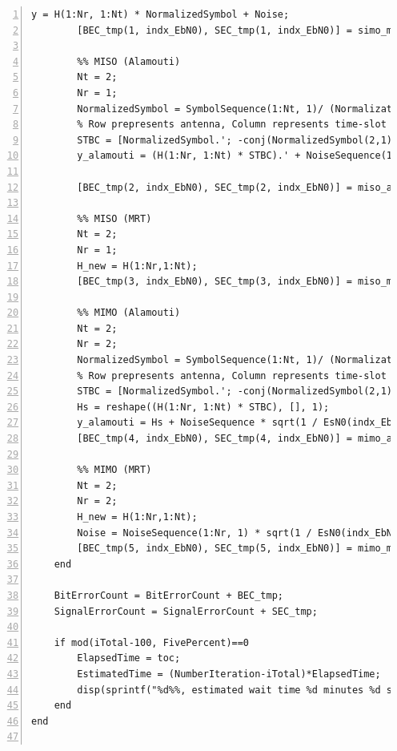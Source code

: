 \documentclass{article}
\begin{document}
\begin{lstlisting}[style=Matlab-editor, frame=single, numbers=left,]
        y = H(1:Nr, 1:Nt) * NormalizedSymbol + Noise;
        [BEC_tmp(1, indx_EbN0), SEC_tmp(1, indx_EbN0)] = simo_mrc(y, SignalSequence(1:Nt,1), SignalBinary(1:Nt, :),  M, H(1:Nr, 1:Nt));
        
        %% MISO (Alamouti)
        Nt = 2;
        Nr = 1;
        NormalizedSymbol = SymbolSequence(1:Nt, 1)/ (NormalizationFactor * sqrt(Nt));
        % Row prepresents antenna, Column represents time-slot
        STBC = [NormalizedSymbol.'; -conj(NormalizedSymbol(2,1)) conj(NormalizedSymbol(1,1))].';
        y_alamouti = (H(1:Nr, 1:Nt) * STBC).' + NoiseSequence(1:Nt, 1) * sqrt(1 / EsN0(indx_EbN0));
        
        [BEC_tmp(2, indx_EbN0), SEC_tmp(2, indx_EbN0)] = miso_alamouti(y_alamouti, SignalSequence(1:Nt, 1), SignalBinary(1:Nt, :),  M, H(1:Nr,1:Nt));
        
        %% MISO (MRT)
        Nt = 2;
        Nr = 1;
        H_new = H(1:Nr,1:Nt);
        [BEC_tmp(3, indx_EbN0), SEC_tmp(3, indx_EbN0)] = miso_mrt(SymbolSequence(1), SignalSequence(1), Noise(1:Nr), SignalBinary(1, :), M, H_new);

        %% MIMO (Alamouti)
        Nt = 2;
        Nr = 2;
        NormalizedSymbol = SymbolSequence(1:Nt, 1)/ (NormalizationFactor * sqrt(Nt));
        % Row prepresents antenna, Column represents time-slot
        STBC = [NormalizedSymbol.'; -conj(NormalizedSymbol(2,1)) conj(NormalizedSymbol(1,1))].';
        Hs = reshape((H(1:Nr, 1:Nt) * STBC), [], 1);
        y_alamouti = Hs + NoiseSequence * sqrt(1 / EsN0(indx_EbN0));
        [BEC_tmp(4, indx_EbN0), SEC_tmp(4, indx_EbN0)] = mimo_alamouti(y_alamouti, SignalSequence(1:Nt, 1), SignalBinary(1:Nt, :),  M, H(1:Nr, 1:Nt));
        
        %% MIMO (MRT)
        Nt = 2;
        Nr = 2;
        H_new = H(1:Nr,1:Nt);
        Noise = NoiseSequence(1:Nr, 1) * sqrt(1 / EsN0(indx_EbN0));
        [BEC_tmp(5, indx_EbN0), SEC_tmp(5, indx_EbN0)] = mimo_mrt(SymbolSequence(1), SignalSequence(1), Noise(1:Nr), SignalBinary(1, :), M, H_new);
    end
    
    BitErrorCount = BitErrorCount + BEC_tmp;
    SignalErrorCount = SignalErrorCount + SEC_tmp;
    
    if mod(iTotal-100, FivePercent)==0
        ElapsedTime = toc;
        EstimatedTime = (NumberIteration-iTotal)*ElapsedTime;
        disp(sprintf("%d%%, estimated wait time %d minutes %d seconds", round(iTotal/NumberIteration*100), floor(EstimatedTime/60), floor(mod(EstimatedTime, 60))))
    end
end


\end{lstlisting}
\end{document}
